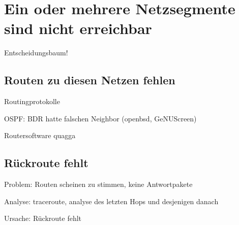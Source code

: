 
\section{Ein oder mehrere Netzsegmente sind nicht erreichbar}
\label{sec:ausfall-netzsegment}

\begin{notes}
\item Entscheidungsbaum!
\end{notes}

\subsection{Routen zu diesen Netzen fehlen}
\label{sec:routen fehlen}

\begin{notes}
\item Routingprotokolle
\item OSPF: BDR hatte falschen Neighbor (openbsd, GeNUScreen)
\item Routersoftware quagga
\end{notes}

\subsection{Rückroute fehlt}
\label{sec:rueckroute-fehlt}

\begin{notes}
\item Problem: Routen scheinen zu stimmen, keine Antwortpakete
\item Analyse: traceroute, analyse des letzten Hops und desjenigen danach
\item Ursache: Rückroute fehlt
\end{notes}




